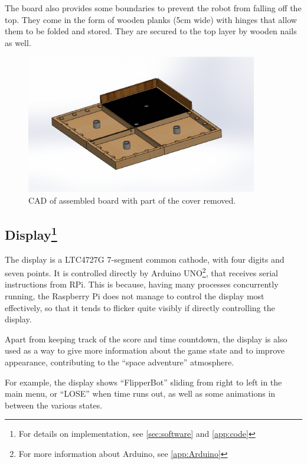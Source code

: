 \documentclass[a4paper,twoside]{book}
\begin{document}
The board also provides some boundaries to prevent the robot from falling off the top. They come in the form of wooden planks (5cm wide) with hinges that allow them to be folded and stored. They are secured to the top layer by wooden nails as well.

\begin{figure}[h]
\centering
\includegraphics[width=0.9\textwidth]{img/Board.eps}
\caption{CAD of assembled board with part of the cover removed.}
\end{figure}

\subsection[Display]{Display\footnote{For details on implementation, see \autoref{sec:software} and \autoref{app:code}}}
\label{ssec:display}

The display is a LTC4727G 7-segment common cathode, with four digits and seven points. It is controlled directly by Arduino UNO\footnote{For more information about Arduino, see \autoref{app:Arduino}}, that receives serial instructions from RPi. This is because, having many processes concurrently running, the Raspberry Pi does not manage to control the display most effectively, so that it tends to flicker quite visibly if directly controlling the display.

Apart from keeping track of the score and time countdown, the display is also used as a way to give more information about the game state and to improve appearance, contributing to the \textquotedblleft{}space adventure\textquotedblright{}  atmosphere.

For example, the display shows \textquotedblleft{}FlipperBot\textquotedblright{}  sliding from right to left in the main menu, or \textquotedblleft{}LOSE\textquotedblright{}  when time runs out, as well as some animations in between the various states.
\end{document}
